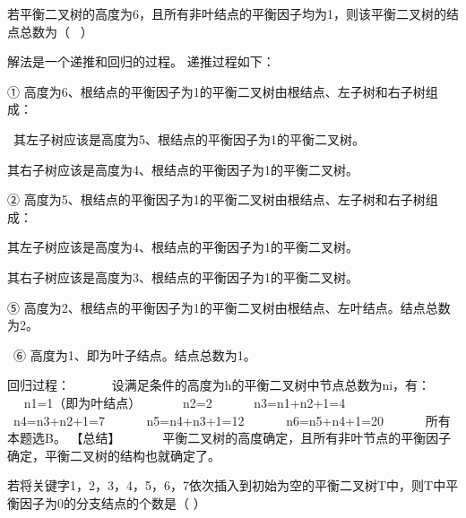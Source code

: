 \question 若平衡二叉树的高度为6，且所有非叶结点的平衡因子均为1，则该平衡二叉树的结点总数为（
~）
\par{}
\begin{solution}解法是一个递推和回归的过程。 递推过程如下： ~ ~ ~ ~

①
高度为6、根结点的平衡因子为1的平衡二叉树由根结点、左子树和右子树组成：~
~ ~ ~

~其左子树应该是高度为5、根结点的平衡因子为1的平衡二叉树。~ ~ ~ ~~

其右子树应该是高度为4、根结点的平衡因子为1的平衡二叉树。 ~ ~ ~ ~

②
高度为5、根结点的平衡因子为1的平衡二叉树由根结点、左子树和右子树组成：~
~ ~ ~~

其左子树应该是高度为4、根结点的平衡因子为1的平衡二叉树。 ~ ~ ~ ~

其右子树应该是高度为3、根结点的平衡因子为1的平衡二叉树。 ~ ~ ~ ~

⑤
高度为2、根结点的平衡因子为1的平衡二叉树由根结点、左叶结点。结点总数为2。
~ ~ ~~

~⑥ 高度为1、即为叶子结点。结点总数为1。~

回归过程： ~ ~ ~ ~设满足条件的高度为h的平衡二叉树中节点总数为ni，有： ~
~ ~ ~n1=1（即为叶结点） ~ ~ ~ ~n2=2 ~ ~ ~ ~n3=n1+n2+1=4 ~ ~ ~
~n4=n3+n2+1=7 ~ ~ ~ ~n5=n4+n3+1=12 ~ ~ ~ ~n6=n5+n4+1=20 ~ ~ ~
~所有本题选B。 【总结】 ~ ~ ~
~平衡二叉树的高度确定，且所有非叶节点的平衡因子确定，平衡二叉树的结构也就确定了。
\end{solution}
\question 若将关键字1，2，3，4，5，6，7依次插入到初始为空的平衡二叉树T中，则T中平衡因子为0的分支结点的个数是（
）
\par{}
